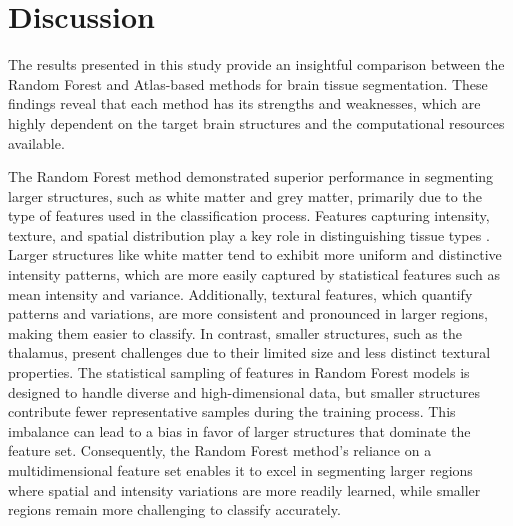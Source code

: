 \section{Discussion}
The results presented in this study provide an insightful comparison between the Random Forest and Atlas-based methods for brain tissue segmentation. These findings reveal that each method has its strengths and weaknesses, which are highly dependent on the target brain structures and the computational resources available.

The Random Forest method demonstrated superior performance in segmenting larger structures, such as white matter and grey matter, primarily due to the type of features used in the classification process. Features capturing intensity, texture, and spatial distribution play a key role in distinguishing tissue types \cite{b15}. Larger structures like white matter tend to exhibit more uniform and distinctive intensity patterns, which are more easily captured by statistical features such as mean intensity and variance. Additionally, textural features, which quantify patterns and variations, are more consistent and pronounced in larger regions, making them easier to classify. In contrast, smaller structures, such as the thalamus, present challenges due to their limited size and less distinct textural properties. The statistical sampling of features in Random Forest models is designed to handle diverse and high-dimensional data, but smaller structures contribute fewer representative samples during the training process. This imbalance can lead to a bias in favor of larger structures that dominate the feature set. Consequently, the Random Forest method's reliance on a multidimensional feature set enables it to excel in segmenting larger regions where spatial and intensity variations are more readily learned, while smaller regions remain more challenging to classify accurately.

